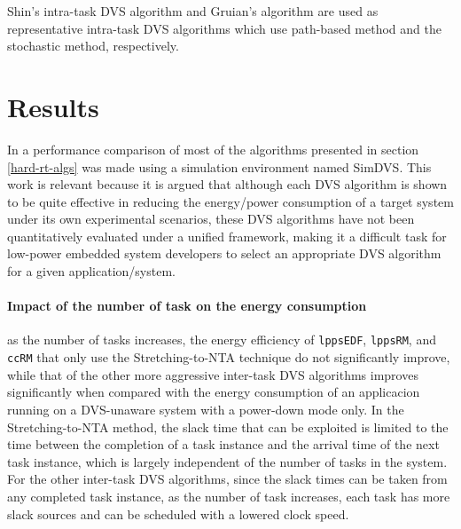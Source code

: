 \documentclass[10pt,article]{IEEEtran}
\begin{document}
Shin's intra-task DVS algorithm \cite{shin-kim-lee} and Gruian's algorithm \cite{gruian} are used as representative intra-task DVS algorithms which use path-based method and the stochastic method, respectively.

\section{Results} \label{sec:results}
In \cite{kim-2} a performance comparison of most of the algorithms presented in section \ref{hard-rt-algs} was made using a simulation environment named SimDVS. This work is relevant because it is argued that although each DVS algorithm is shown to be quite effective in reducing the energy/power consumption of a target system under its own experimental scenarios, these DVS algorithms have not been quantitatively evaluated under a unified framework, making it a difficult task for low-power embedded system developers to select an appropriate DVS algorithm for a given application/system.

\paragraph{Impact of the number of task on the energy consumption} as the number of tasks increases,  the  energy  efficiency  of \texttt{lppsEDF}, \texttt{lppsRM}, and \texttt{ccRM} that only use the Stretching-to-NTA technique do not significantly improve, while that of the other more aggressive inter-task DVS algorithms improves significantly when compared with the energy consumption of an applicacion running on a DVS-unaware system with a power-down mode only. In the Stretching-to-NTA method, the slack time that can be exploited is limited to the time between the completion of a task instance and the arrival time of the next task instance, which is largely independent of the number of tasks in the system. For the other inter-task DVS algorithms, since the slack times can be taken from any completed task instance, as the number of task increases, each task has more slack sources and can be scheduled with a lowered clock speed.
\end{document}
